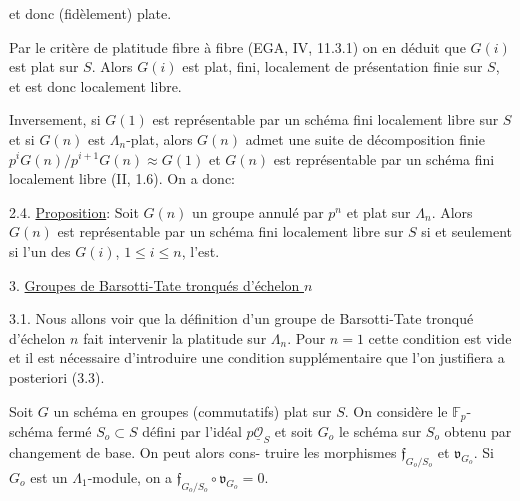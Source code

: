 
et donc (fidèlement) plate.

Par le critère de platitude fibre à fibre (EGA, IV, 11.3.1)
on en déduit que $G(i)$ est plat sur $S$. Alors $G(i)$ est plat, fini,
localement de présentation finie sur $S$, et est donc localement libre.

Inversement, si $G(1)$ est représentable par un schéma fini
localement libre sur $S$ et si $G(n)$ est $\Lambda_n$-plat, alors $G(n)$ admet
une suite de décomposition finie $p^iG(n)/p^{i+1}G(n) \approx G(1)$ et $G(n)$ est
représentable par un schéma fini localement libre (II, 1.6). On a donc:

2.4. \uline{Proposition}: Soit $G(n)$ un groupe annulé par $p^n$ et plat sur
$\Lambda_n$. Alors $G(n)$ est représentable par un schéma fini localement libre
sur $S$ si et seulement si l'un des $G(i)$, $1 \leq i \leq n$, l'est.

3. \uline{Groupes de Barsotti-Tate tronqués d'échelon $n$}

3.1. Nous allons voir que la définition d'un groupe de Barsotti-Tate
tronqué d'échelon $n$ fait intervenir la platitude sur $\Lambda_n$. Pour $n = 1$
cette condition est vide et il est nécessaire d'introduire une condition
supplémentaire que l'on justifiera a posteriori (3.3).

Soit $G$ un schéma en groupes (commutatifs) plat sur $S$. On
considère le $\mathbb{F}_p$-schéma fermé $S_o \subset S$ défini par l'idéal $p\underline{\mathcal{O}}_S$ et soit
$G_o$ le schéma sur $S_o$ obtenu par changement de base. On peut alors cons-%
truire les morphismes $\mathfrak{f}_{G_o/S_o}$ et $\mathfrak{v}_{G_o}$. Si $G_o$ est un $\Lambda_1$-module, on a
$\mathfrak{f}_{G_o/S_o} \circ \mathfrak{v}_{G_o} = 0$.

